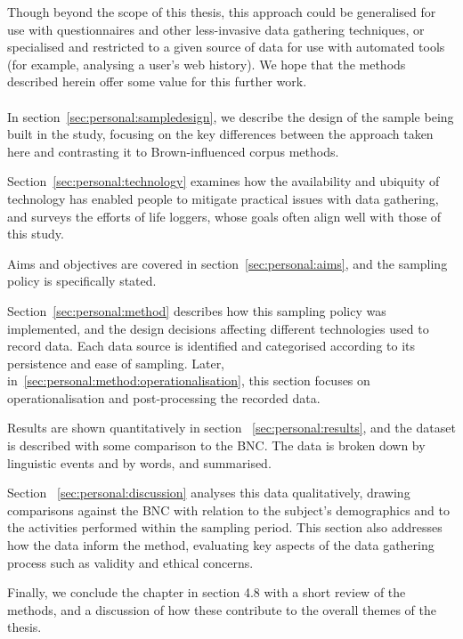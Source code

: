 Though beyond the scope of this thesis, this approach could be generalised for use with questionnaires and other less-invasive data gathering techniques, or specialised and restricted to a given source of data for use with automated tools (for example, analysing a user's web history).  We hope that the methods described herein offer some value for this further work.


\paragraph{}
In section~\ref{sec:personal:sampledesign}, we describe the design of the sample being built in the study, focusing on the key differences between the approach taken here and contrasting it to Brown-influenced corpus methods.

Section~\ref{sec:personal:technology} examines how the availability and ubiquity of technology has enabled people to mitigate practical issues with data gathering, and surveys the efforts of life loggers, whose goals often align well with those of this study.

Aims and objectives are covered in section~\ref{sec:personal:aims}, and the sampling policy is specifically stated.

Section~\ref{sec:personal:method} describes how this sampling policy was implemented, and the design decisions affecting different technologies used to record data.  Each data source is identified and categorised according to its persistence and ease of sampling.  Later, in~\ref{sec:personal:method:operationalisation}, this section focuses on operationalisation and post-processing the recorded data.

Results are shown quantitatively in section ~\ref{sec:personal:results}, and the dataset is described with some comparison to the BNC.  The data is broken down by linguistic events and by words, and summarised.

Section ~\ref{sec:personal:discussion} analyses this data qualitatively, drawing comparisons against the BNC with relation to the subject's demographics and to the activities performed within the sampling period.  This section also addresses how the data inform the method, evaluating key aspects of the data gathering process such as validity and ethical concerns.

Finally, we conclude the chapter in section 4.8 with a short review of the methods, and a discussion of how these contribute to the overall themes of the thesis.

